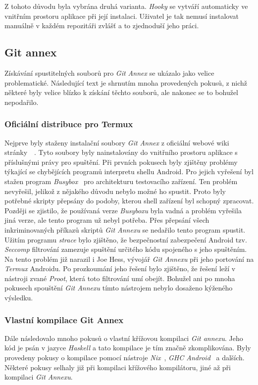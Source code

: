     Z tohoto důvodu byla vybrána druhá varianta. \emph{Hooky} se vytváří automaticky ve vnitřním prostoru aplikace při její instalaci. Uživatel je tak nemusí instalovat manuálně v každém repozitáři zvlášť a to zjednoduší jeho práci.

    \subsection{Git annex}\label{sec:problemy_annex}
    Získávání spustitelných souborů pro \emph{Git Annex} se ukázalo jako velice problematické. Následující text je shrnutím mnoha provedených pokusů, z nichž některé byly velice blízko k získání těchto souborů, ale nakonec se to bohužel nepodařilo.

    \subsubsection{Oficiální distribuce pro Termux}
    Nejprve byly staženy instalační soubory \emph{Git Annex} z oficiální webové wiki stránky~~. Tyto soubory byly nainstalovány do vnitřního prostoru aplikace s příslušnými právy pro spuštění. Při prvních pokusech byly zjištěny problémy týkající se chybějících programů interpretu shellu Android. Pro jejich vyřešení byl stažen program \emph{Busybox}~ pro architekturu testovacího zařízení. Ten problém nevyřešil, jelikož z nějakého důvodu nebylo možné ho spustit. Proto byly potřebné skripty přepsány do podoby, kterou shell zařízení byl schopný zpracovat. Později se zjistilo, že používaná verze \emph{Busyboxu} byla vadná a problém vyřešila jiná verze, ale tento program už nebyl potřeba. Přes přepsání všech inkriminovaných příkazů skriptů \emph{Git Annexu} se nedařilo tento program spustit. Užitím programu \emph{strace} bylo zjištěno, že bezpečnostní zabezpečení Android tzv. \emph{Seccomp} filtrování zamezuje spuštění určitého kódu spojeného s jeho spuštěním. Na tento problém již narazil i Joe Hess, vývojář \emph{Git Annexu} při jeho portování na \emph{Termux} Androidu. Po prozkoumání jeho řešení bylo zjištěno, že řešení leží v nástroji zvané \emph{Proot}, která toto filtrování umí obejít. Bohužel ani po mnoha pokusech spouštění \emph{Git Annexu} tímto nástrojem nebylo dosaženo kýženého výsledku.

    \subsubsection{Vlastní kompilace Git Annex}
    Dále následovalo mnoho pokusů o vlastní křížovou kompilaci \emph{Git annexu}. Jeho kód je psán v jazyce \emph{Haskell} a tato kompilace je tím značně zkomplikována. Byly provedeny pokusy o kompilace pomocí nástroje \emph{Nix}~, \emph{GHC Android}~ a dalších. Některé pokusy selhaly již při kompilaci křížového kompilátoru, jiné až při kompilaci \emph{Git Annexu}.


